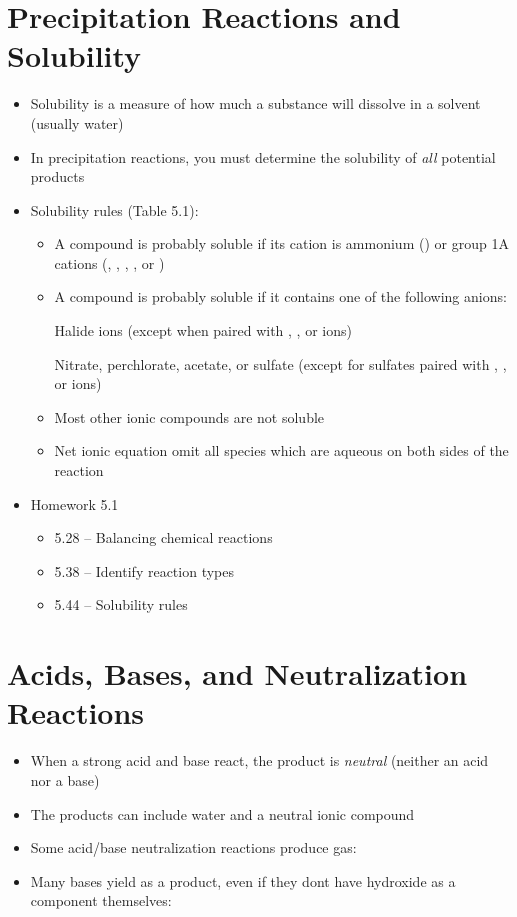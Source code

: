 \documentclass[12pt, openany, letterpaper]{memoir}
\begin{document}
\section{Precipitation Reactions and Solubility}
\begin{itemize}
	\item Solubility is a measure of how much a substance will dissolve in a solvent (usually water)
	\item In precipitation reactions, you must determine the solubility of \emph{all} potential products
	\item Solubility rules (Table 5.1):
	      \begin{itemize}
		      \item A compound is probably soluble if its cation is ammonium () or group 1A cations (, , , , or )
		      \item A compound is probably soluble if it contains one of the following anions:

		            Halide ions (except when paired with , , or  ions)

		            Nitrate, perchlorate, acetate, or sulfate (except for sulfates paired with , , or  ions)
		      \item Most other ionic compounds are not soluble
		      \item Net ionic equation omit all species which are aqueous on both sides of the reaction
	      \end{itemize}
	\item Homework 5.1
	      \begin{itemize}
		      \item 5.28 -- Balancing chemical reactions
		      \item 5.38 -- Identify reaction types
		      \item 5.44 -- Solubility rules
	      \end{itemize}
\end{itemize}
\section{Acids, Bases, and Neutralization Reactions}
\begin{itemize}
	\item When a strong acid and base react, the product is \emph{neutral} (neither an acid nor a base)
	\item The products can include water and a neutral ionic compound
	\item Some acid/base neutralization reactions produce gas: 
	\item Many bases yield  as a product, even if they dont have hydroxide as a component themselves: 
\end{itemize}
\end{document}
